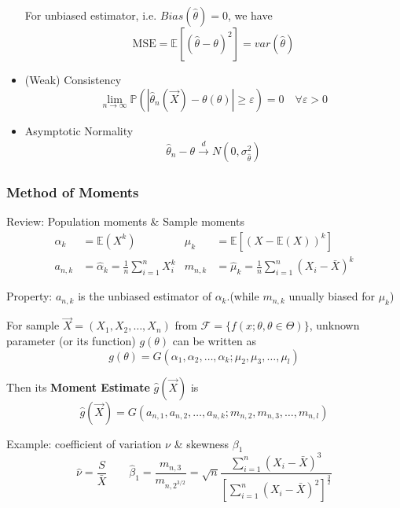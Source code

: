 \begin{itemize}
        For unbiased estimator, i.e. $Bias(\hat{\theta})=0$, we have
        \begin{equation}
            \text{MSE}=\mathbb{E}[(\hat{\theta}-\theta)^2]=var(\hat{\theta})
        \end{equation}
        \item (Weak) Consistency
        \begin{equation}
            \lim_{n\to\infty}\mathbb{P}(|\hat{\theta }_n(\vec{X})-\theta (\theta)|\geq \varepsilon)=0\quad\forall\varepsilon>0    
        \end{equation}
        \item Asymptotic Normality
        \begin{align}
            \hat{\theta }_n-\theta \xrightarrow[]{d} N(0,\sigma ^2_{\hat{\theta }}) 
        \end{align}
        
        
    \end{itemize}


\subsubsection{Method of Moments}\label{SubSectionMoM}
    Review: Population moments \& Sample moments
    \begin{align}
        \alpha_k&=\mathbb{E}(X^k)&\mu_k&=\mathbb{E}[(X-\mathbb{E}(X))^k]\\
        a_{n,k}&=\hat{\alpha }_k =\frac{1}{n}\sum_{i=1}^nX_i^k&m_{n,k}&=\hat{\mu }_k=\frac{1}{n}\sum_{i=1}^n(X_i-\bar{X})^k
    \end{align}

    Property: $a_{n,k}$ is the unbiased estimator of $\alpha_k$.(while $m_{n,k}$ unually biased for $\mu_k$)

    For sample $\vec{X}=(X_1,X_2,\ldots,X_n)$ from $\mathscr{F}=\{f(x;\theta,\theta\in\Theta)\}$, unknown parameter (or its function) $g(\theta)$ can be written as
    \begin{equation}
        g(\theta)=G(\alpha_1,\alpha_2,\ldots,\alpha_k;\mu_2,\mu_3,\ldots,\mu_l)    
    \end{equation}

    Then its \textbf{Moment Estimate} $\hat{g}(\vec{X})$ is
\begin{equation}
    \hat{g}(\vec{X})=G(a_{n,1},a_{n,2},\ldots,a_{n,k};m_{n,2},m_{n,3},\ldots,m_{n,l}) 
\end{equation}

    Example: coefficient of variation $ \nu $ \& skewness $ \beta _1 $
    \begin{equation}\hat{\nu}=\dfrac{S}{\bar{X}}\qquad\hat{\beta}_1=\dfrac{m_{n,3}}{m_{n,2^{3/2}}}=\sqrt{n}{\displaystyle\frac{\displaystyle{\sum_{i=1}^n(X_i-\bar{X})^3}}{\displaystyle{\left[\sum_{i=1}^n(X_i-\bar{X})^2\right]^{\frac{3}{2}}}  }}\end{equation}

